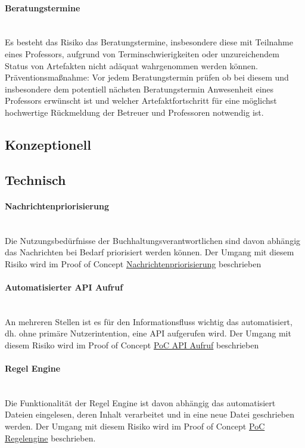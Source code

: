 \documentclass[11pt,oneside,a4paper,notitlepage]{article}
\begin{document}
\paragraph{Beratungstermine}\\
Es besteht das Risiko das Beratungstermine, insbesondere diese mit Teilnahme eines Professors, aufgrund von Terminschwierigkeiten oder unzureichendem Status von Artefakten
nicht adäquat wahrgenommen werden können.\\
Präventionsmaßnahme: Vor jedem Beratungstermin prüfen ob bei diesem und insbesondere dem potentiell nächsten Beratungstermin Anwesenheit eines Professors erwünscht ist und
welcher Artefaktfortschritt für eine möglichst hochwertige Rückmeldung der Betreuer und Professoren notwendig ist.


%
\subsection{Konzeptionell}


%
\subsection{Technisch}

\paragraph{Nachrichtenpriorisierung}\\
Die Nutzungsbedürfnisse der Buchhaltungsverantwortlichen sind davon abhängig das Nachrichten bei Bedarf priorisiert werden können.
Der Umgang mit diesem Risiko wird im Proof of Concept \href{}{Nachrichtenpriorisierung} beschrieben

\paragraph{Automatisierter API Aufruf}\\
An mehreren Stellen ist es für den Informationsfluss wichtig das automatisiert, dh. ohne primäre Nutzerintention, eine API aufgerufen wird.
Der Umgang mit diesem Risiko wird im Proof of Concept \href{}{PoC API Aufruf} beschrieben

\paragraph{Regel Engine}\\
Die Funktionalität der Regel Engine ist davon abhängig das automatisiert Dateien eingelesen, deren Inhalt verarbeitet und in eine neue Datei geschrieben werden.
Der Umgang mit diesem Risiko wird im Proof of Concept \href{}{PoC Regelengine} beschrieben.
\end{document}
